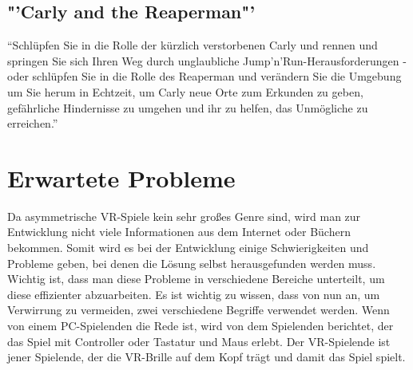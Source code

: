 \subsection{"'Carly and the Reaperman"'}
"`Schlüpfen Sie in die Rolle der kürzlich verstorbenen Carly und rennen und springen Sie sich Ihren Weg durch unglaubliche Jump'n'Run-Herausforderungen - oder schlüpfen Sie in die Rolle des Reaperman und verändern Sie die Umgebung um Sie herum in Echtzeit, um Carly neue Orte zum Erkunden zu geben, gefährliche Hindernisse zu umgehen und ihr zu helfen, das Unmögliche zu erreichen."'
\cite{_steam_carly}

\section{Erwartete Probleme}
Da asymmetrische VR-Spiele kein sehr großes Genre sind, wird man zur Entwicklung nicht viele Informationen aus dem Internet oder Büchern bekommen. Somit wird es bei der Entwicklung einige Schwierigkeiten und Probleme geben, bei denen die Lösung selbst herausgefunden werden muss. Wichtig ist, dass man diese Probleme in verschiedene Bereiche unterteilt, um diese effizienter abzuarbeiten. Es ist wichtig zu wissen, dass von nun an, um Verwirrung zu vermeiden, zwei verschiedene Begriffe verwendet werden. Wenn von einem PC-Spielenden die Rede ist, wird von dem Spielenden berichtet, der das Spiel mit Controller oder Tastatur und Maus erlebt. Der VR-Spielende ist jener Spielende, der die VR-Brille auf dem Kopf trägt und damit das Spiel spielt.
\cite{_motionsickness}
\cite{_vr_quovadis}

